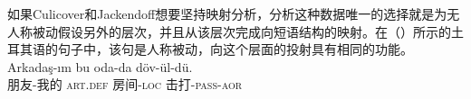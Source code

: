 \begin{exe}
\begin{xlist}[iv.]
\begin{exe}
\begin{xlist}[iv.]

如果Culicover和Jackendoff想要坚持映射分析，分析这种数据唯一的选择就是为无人称被动假设另外的层次，并且从该层次完成向短语结构的映射。在（）所示的土耳其语的句子中，该句是人称被动，向这个层面的投射具有相同的功能。
\ea
\gll Arkadaş-ım bu oda-da döv-ül-dü.\\
     朋友-我的  \textsc{art}.\textsc{def}   房间-\textsc{loc} 击打-\textsc{pass}-\textsc{aor}\\
%
\z


\end{xlist}
\end{exe}
\end{xlist}
\end{exe}
